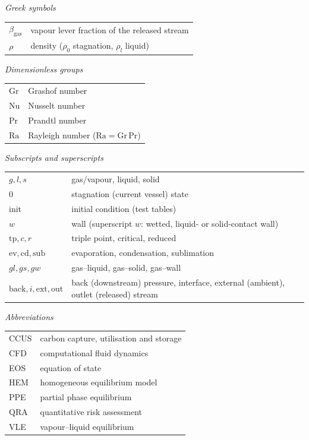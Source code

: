 \documentclass[5p,authoryear]{elsarticle}
\begin{document}
{\vspace{5pt}\noindent\textit{Greek symbols}\\[2pt]
\begin{tabular}{@{}p{}p{}@{}}
$\beta_\text{gas}$ & vapour lever fraction of the released stream \\
$\rho$ & density ($\rho_0$ stagnation, $\rho_l$ liquid) \\
\end{tabular}

\vspace{5pt}\noindent\textit{Dimensionless groups}\\[2pt]
\begin{tabular}{@{}p{}p{}@{}}
$\mathrm{Gr}$ & Grashof number \\
$\mathrm{Nu}$ & Nusselt number \\
$\mathrm{Pr}$ & Prandtl number \\
$\mathrm{Ra}$ & Rayleigh number ($\mathrm{Ra}=\mathrm{Gr}\,\mathrm{Pr}$) \\
\end{tabular}

\vspace{5pt}\noindent\textit{Subscripts and superscripts}\\[2pt]
\begin{tabular}{@{}p{}p{}@{}}
$g,l,s$ & gas/vapour, liquid, solid \\
$0$ & stagnation (current vessel) state \\
$\text{init}$ & initial condition (test tables) \\
$w$ & wall (superscript $w$: wetted, liquid- or solid-contact wall) \\
$\text{tp},c,r$ & triple point, critical, reduced \\
$\text{ev},\text{cd},\text{sub}$ & evaporation, condensation, sublimation \\
$gl,gs,gw$ & gas--liquid, gas--solid, gas--wall \\
$\text{back},i,\text{ext},\text{out}$ & back (downstream) pressure, interface, external (ambient), outlet (released) stream \\
\end{tabular}

\vspace{5pt}\noindent\textit{Abbreviations}\\[2pt]
\begin{tabular}{@{}p{}p{}@{}}
CCUS & carbon capture, utilisation and storage \\
CFD & computational fluid dynamics \\
EOS & equation of state \\
HEM & homogeneous equilibrium model \\
PPE & partial phase equilibrium \\
QRA & quantitative risk assessment \\
VLE & vapour--liquid equilibrium \\
\end{tabular}
}
\linenumbers
\end{document}
